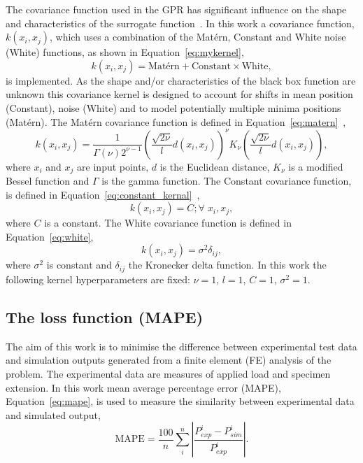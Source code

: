 \documentclass[preprint, review, 12pt]{elsarticle}
\begin{document}
	The covariance function used in the GPR has significant influence on the shape and characteristics of the surrogate function~\cite{MONGAN2022}.
	In this work a covariance function, $k(x_i, x_j)$, which uses a combination of the Mat\'ern, Constant and White noise (White) functions, as shown in Equation~\ref{eq:mykernel},
	\begin{equation}
		k(x_i, x_j) = \text{Mat\'ern} + \text{Constant} \times \text{White},
		\label{eq:mykernel}
	\end{equation}
	is implemented.
	As the shape and/or characteristics of the black box function are unknown this covariance kernel is designed to account for shifts in mean position (Constant), noise (White) and to model potentially multiple minima positions (Mat\'ern).
	The Mat\'ern covariance function is defined in Equation~\ref{eq:matern}~\cite{PEDREGOSA2011},
	\begin{equation}
		k(x_i, x_j) = \frac{1}{\Gamma \left( \nu \right)2^{\nu-1}} \left( \frac{\sqrt{2\nu}}{l} d\left( x_i, x_j \right) \right)^{\nu}K_{\nu} \left( \frac{\sqrt{2\nu}}{l} d\left( x_i, x_j \right) \right),
		\label{eq:matern}
	\end{equation}
	where $x_i$ and $x_j$ are input points, $d$ is the Euclidean distance, $K_{\nu}$ is a modified Bessel function and $\Gamma$ is the gamma function.
	The Constant covariance function, is defined in Equation~\ref{eq:constant_kernal}~\cite{PEDREGOSA2011},
	\begin{equation}
		k\left( x_i, x_j \right) = C; \forall \; x_i, x_j,
		\label{eq:constant_kernal}
	\end{equation}
	where $C$ is a constant.
	The White covariance function is defined in Equation~\ref{eq:white},
	\begin{equation}
		k(x_i, x_j) = \sigma^2 \delta_{ij},
		\label{eq:white}
	\end{equation}
 	where $\sigma^2$ is constant and $\delta_{ij}$ the Kronecker delta function.
	In this work the following kernel hyperparameters are fixed: $\nu=1$, $l=1$, $C=1$, $\sigma^2=1$.

	\subsection{The loss function (MAPE)}
	\label{h:mape_detailed}

	The aim of this work is to minimise the difference between experimental test data and simulation outputs generated from a finite element (FE) analysis of the problem.
	The experimental data are measures of applied load and specimen extension.
	In this work mean average percentage error (MAPE), Equation~\ref{eq:mape}, is used to measure the similarity between experimental data and simulated output,
 	\begin{equation}
	\text{MAPE} = \frac{100}{n} \sum_i^n \left| \frac{P_{exp}^i - P_{sim}^i}{P_{exp}^i} \right|.
	\label{eq:mape}
	\end{equation}
\end{document}
